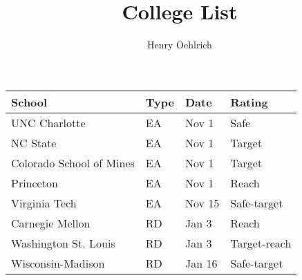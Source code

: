 \documentclass{article}
\title{College List}
\author{Henry Oehlrich}
\begin{document}
\maketitle
\centering
\begin{tabular}{p{5cm}p{1cm}p{1.5cm}p{2.5cm}}
    \toprule
    School & Type & Date & Rating \\
    \midrule
    UNC Charlotte & EA & Nov 1 & Safe \\
    NC State & EA & Nov 1 & Target \\
    Colorado School of Mines & EA & Nov 1 & Target \\
    Princeton & EA & Nov 1 & Reach \\
    Virginia Tech & EA & Nov 15 & Safe-target \\
    Carnegie Mellon & RD & Jan 3 & Reach \\
    Washington St. Louis & RD & Jan 3 & Target-reach \\
    Wisconsin-Madison & RD & Jan 16 & Safe-target \\
    \bottomrule
\end{tabular}
\end{document}
